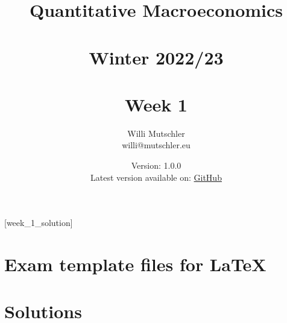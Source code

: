 
\newif\ifDisplaySolutions\DisplaySolutionstrue


\title{Quantitative Macroeconomics\\~\\Winter 2022/23\\~\\Week 1}
\author{Willi Mutschler\\willi@mutschler.eu}
\date{Version: 1.0.0\\Latest version available on: \href{https://github.com/wmutschl/Quantitative-Macroeconomics/releases/latest/download/week1.pdf}{GitHub}}
\maketitle\thispagestyle{empty}

\newpage
{}[week_1_solution]
\tableofcontents\thispagestyle{empty}\newpage

\setcounter{page}{1}
\newpage
\newpage
\newpage
\newpage
\printbibliography
\newpage
\appendix
\section{Exam template files for \LaTeX}




\ifDisplaySolutions
\newpage
\section{Solutions}

\fi
